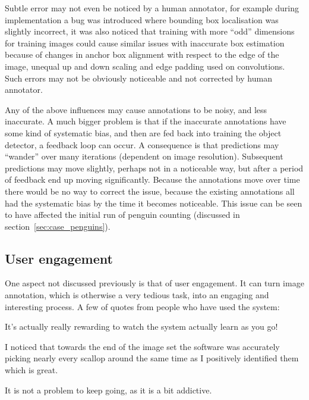 Subtle error may not even be noticed by a human annotator, for example  during implementation a bug was introduced where bounding box localisation was slightly incorrect, it was also noticed that training with more ``odd'' dimensions for training images could cause similar issues with inaccurate box estimation because of changes in anchor box alignment with respect to the edge of the image, unequal up and down scaling and edge padding used on convolutions. Such errors may not be obviously noticeable and not corrected by human annotator.
 
Any of the above influences may cause annotations to be noisy, and less inaccurate. A much bigger problem is that if the inaccurate annotations have some kind of systematic bias, and then are fed back into training the object detector, a feedback loop can occur. A consequence is that predictions may ``wander'' over many iterations (dependent on image resolution). Subsequent predictions may move slightly, perhaps not in a noticeable way, but after a period of feedback end up moving significantly. Because the annotations move over time there would be no way to correct the issue, because the existing annotations all had the systematic bias by the time it becomes noticeable. This issue can be seen to have affected the initial run of penguin counting (discussed in section~\ref{sec:case_penguins}).   
\subsection{User engagement}
\label{sec:engagement}

One aspect not discussed previously is that of user engagement. It can turn image annotation, which is otherwise a very tedious task, into an engaging and interesting process. A few of quotes from people who have used the system:

\begin{displayquote}
It's actually really rewarding to watch the system actually learn as you go!
\end{displayquote}

\begin{displayquote}
I noticed that towards the end of the image set the software was accurately picking nearly every scallop around the same time as I positively identified them which is great.
\end{displayquote}

\begin{displayquote}
 It is not a problem to keep going, as it is a bit addictive.
\end{displayquote}

